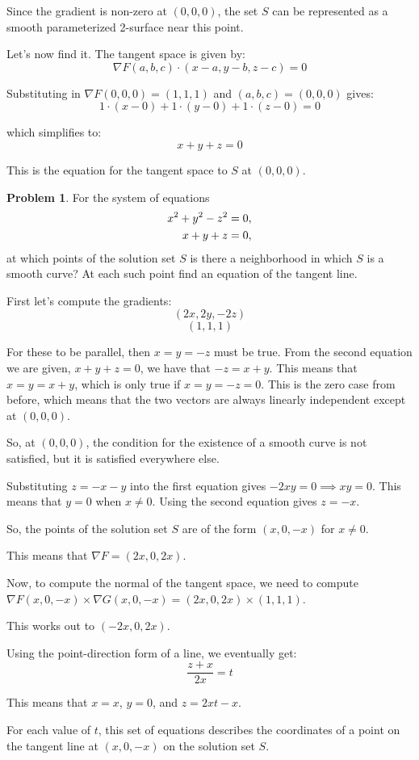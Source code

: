 \documentclass[12]{amsart}
\theoremstyle{definition}
\newtheorem{xca}{Problem}
\newcommand{\sskip}{\newpage}
\begin{document}
Since the gradient is non-zero at $(0, 0, 0)$, the set $S$ can be represented
as a smooth parameterized 2-surface near this point.

Let's now find it. The tangent space is given by:
\[\nabla F(a, b, c) \cdot (x-a, y-b, z-c) = 0\]

Substituting in $\nabla F(0, 0, 0) = (1, 1, 1)$ and $(a, b, c) = (0, 0, 0)$ gives:
\[1 \cdot (x-0) + 1 \cdot (y-0) + 1 \cdot (z-0) = 0\]

which simplifies to:
\[x + y + z = 0\]

This is the equation for the tangent space to $S$ at $(0, 0, 0)$.


\sskip
\begin{xca} %

For the system of equations
\begin{align}
\notag x^2+y^2-z^2 & =0,\\
\notag x+y+z &=0,
\end{align}
at which points of the solution set $S$ is there a neighborhood in which $S$ is a smooth curve? At each such point  find an equation of the tangent line.
\end{xca}


First let's compute the gradients:
\[(2x, 2y, -2z)\]
\[(1, 1, 1)\]

For these to be parallel, then $x = y = -z$ must be true. From the second
equation we are given, $x + y + z = 0$, we have that $-z = x + y$. This means that
$x = y = x+y$, which is only true if $x = y = -z = 0$. This is the zero case from
before, which means that the two vectors are always linearly independent
except at $(0, 0, 0)$.

So, at $(0, 0, 0)$, the condition for the existence of a smooth curve is not
satisfied, but it is satisfied everywhere else.

Substituting $z = -x -y$ into the first equation gives $-2xy = 0 \implies xy = 0$.
This means that $y = 0$ when $x \neq 0$.
Using the second equation gives $z = -x$.

So, the points of the solution set $S$ are of the form $(x, 0, -x)$
for $x \neq 0$.

This means that $\nabla F = (2x, 0, 2x)$.

Now, to compute the normal of the tangent space, we need to compute
$\nabla F(x, 0, -x) \times \nabla G(x, 0, -x) = (2x, 0, 2x) \times (1, 1, 1)$.

This works out to $(-2x, 0, 2x)$.

Using the point-direction form of a line, we eventually get:
\[\frac{z+x}{2x} = t\]

This means that $x = x$, $y = 0$, and $z = 2xt - x$.

For each value of $t$, this set of equations describes the coordinates of a point
on the tangent line at $(x, 0, -x)$ on the solution set $S$.
\end{document}
